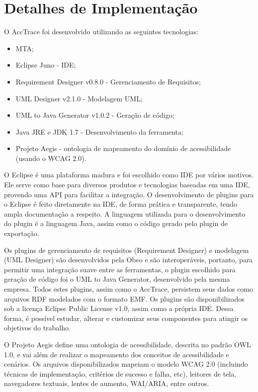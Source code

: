 \documentclass[runningheads,a4paper]{llncs}
\begin{document}
\section{Detalhes de Implementação}

O AccTrace foi desenvolvido utilizando as seguintes tecnologias:

\begin{itemize}
  \item MTA;
  \item Eclipse Juno - IDE;
  \item Requirement Designer v0.8.0 - Gerenciamento de Requisitos;
  \item UML Designer v2.1.0 - Modelagem UML;
  \item UML to Java Generator v1.0.2 - Geração de código;
  \item Java JRE e JDK 1.7 - Desenvolvimento da ferramenta;
  \item Projeto Aegis - ontologia de mapeamento do domínio de acessibilidade (usando o WCAG 2.0).
\end{itemize}

O Eclipse é uma plataforma madura e foi escolhido como IDE por vários motivos. Ele
serve como base para diversos produtos e tecnologias baseadas em uma IDE, provendo
uma API para facilitar a integração. O desenvolvimento de plugins para o Eclipse é feito diretamente na IDE,
de forma prática e transparente, tendo ampla documentação a respeito. A linguagem
utilizada para o desenvolvimento do plugin é a linguagem Java, assim como o código
gerado pelo plugin de exportação.

Os plugins de gerenciamento de requisitos (Requirement Designer) e modelagem (UML Designer) são desenvolvidos pela Obeo e são interoperáveis, portanto, para permitir uma integração suave entre as ferramentas, o plugin escolhido para geração de código foi o UML to Java Generator, desenvolvido pela
mesma empresa. Todos estes plugins, assim como o AccTrace, persistem seus dados como arquivos RDF modelados com o formato EMF. Os plugins são disponibilizados sob a licença Eclipse Public License v1.0, assim como a própria IDE. Dessa forma, é possível estudar, alterar e customizar seus componentes para atingir os objetivos do trabalho.

O Projeto Aegis \cite{aegis:13} define uma ontologia de acessibilidade, descrita no padrão OWL 1.0, e vai além de realizar o mapeamento dos conceitos de acessibilidade e cenários. Os arquivos disponibilizados mapeiam o modelo WCAG 2.0 (incluindo técnicas de implementação, critérios de sucesso e falha, etc), leitores de tela, navegadores textuais, lentes de aumento, WAI/ARIA, entre outros.
\end{document}
